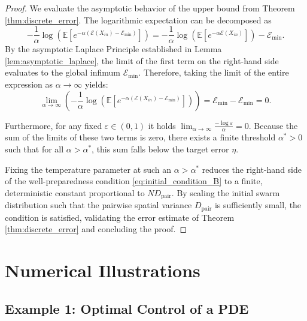 \documentclass[12pt]{amsart}
\numberwithin{equation}{section}
\begin{document}
\begin{proof}
We evaluate the asymptotic behavior of the upper bound from Theorem \ref{thm:discrete_error}. The logarithmic expectation can be decomposed as
\begin{equation*}
    - \frac{1}{\alpha} \log \left( \mathbb{E} \left[ e^{-\alpha (\mathscr{E}(X_{in}) - \mathscr{E}_{\min})} \right] \right) = - \frac{1}{\alpha} \log \left( \mathbb{E} \left[ e^{-\alpha \mathscr{E}(X_{in})} \right] \right) - \mathscr{E}_{\min}.
\end{equation*}
By the asymptotic Laplace Principle established in Lemma \ref{lem:asymptotic_laplace}, the limit of the first term on the right-hand side evaluates to the global infimum $\mathscr{E}_{\min}$. Therefore, taking the limit of the entire expression as $\alpha \to \infty$ yields:
\begin{equation*}
    \lim_{\alpha \to \infty} \left( - \frac{1}{\alpha} \log \left( \mathbb{E} \left[ e^{-\alpha (\mathscr{E}(X_{in}) - \mathscr{E}_{\min})} \right] \right) \right) = \mathscr{E}_{\min} - \mathscr{E}_{\min} = 0.
\end{equation*}

Furthermore, for any fixed $\varepsilon \in (0, 1)$ it holds $\lim_{\alpha \to \infty} \frac{-\log \varepsilon}{\alpha} = 0$. Because the sum of the limits of these two terms is  zero, there exists a finite threshold $\alpha^* > 0$ such that for all $\alpha > \alpha^*$, this sum falls below the target error $\eta$.

Fixing the temperature parameter at such an $\alpha > \alpha^*$ reduces the right-hand side of the well-preparedness condition \eqref{eq:initial_condition_B} to a finite, deterministic constant proportional to $N D_{\text{pair}}$. By scaling the initial swarm distribution such that the pairwise spatial variance $D_{\text{pair}}$ is sufficiently small, the condition is satisfied, validating the error estimate of Theorem \ref{thm:discrete_error} and concluding the proof.
\end{proof}


\section{Numerical Illustrations}\label{sec:numerics}

\subsection{Example 1: Optimal Control of a PDE }\label{sec:control of pde}
\end{document}
